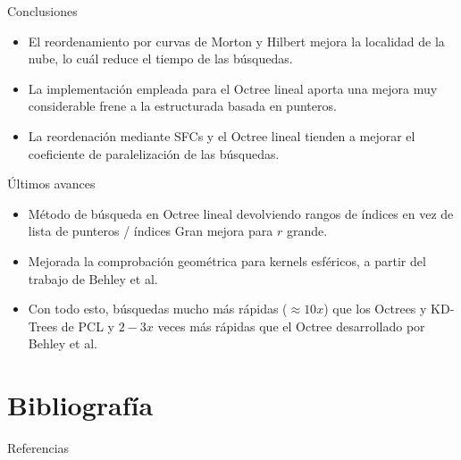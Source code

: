 \documentclass[aspectratio=169]{beamer}
\begin{document}
\begin{frame}{Conclusiones}
    \begin{itemize}
        \item El reordenamiento por curvas de Morton y Hilbert mejora la localidad de la nube, lo cuál reduce el tiempo de las búsquedas.
        \item La implementación empleada para el Octree lineal aporta una mejora muy considerable frene a la estructurada basada en punteros.
        \item La reordenación mediante SFCs y el Octree lineal tienden a mejorar el coeficiente de paralelización de las búsquedas.
    \end{itemize}
\end{frame}

\begin{frame}{Últimos avances}
    \begin{itemize}
        \item Método de búsqueda en Octree lineal devolviendo rangos de índices en vez de lista de punteros / índices \textrightarrow \: Gran mejora para $r$ grande.
        \item Mejorada la comprobación geométrica para kernels esféricos, a partir del trabajo de Behley et al. \cite{behley2015efficient}
        \item Con todo esto, búsquedas mucho más rápidas ($\approx 10x$) que los Octrees y KD-Trees de PCL y $2-3x$ veces más rápidas que el Octree desarrollado por Behley et al. \cite{behley2015efficient}
    \end{itemize}
\end{frame}

\section{Bibliografía}
\begin{frame}[allowframebreaks]{Referencias}
    \printbibliography
\end{frame}


\end{document}
